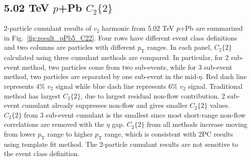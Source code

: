 \subsection{5.02 TeV $p$+Pb $C_{2}\{2\}$}
2-particle cumulant results of $v_{2}$ harmonic from 5.02 TeV $p$+Pb are summarized in Fig.~\ref{fig:result_pPb5_C22}. Four rows have different event class definitions and two columns are particles with different $p_{\text{T}}$ ranges. In each panel, $C_{2}\{2\}$ calculated using three cumulant methods are compared. In particular, for 2 sub-event method, two particles come from two sub-events, while for 3 sub-event method, two particles are separated by one sub-event in the mid-$\eta$. Red dash line represents $4\%$ $v_{2}$ signal while blue dash line represents $6\%$ $v_{2}$ signal. Traditional method has largest $C_{2}\{2\}$, due to largest residual non-flow contribution. 2 sub-event cumulant already suppresses non-flow and gives smaller $C_{2}\{2\}$ values. $C_{2}\{2\}$ from 3 sub-event cumulant is the smallest since most short-range non-flow correlations are removed with the $\eta$ gap. $C_{2}\{2\}$ from all methods increase moving from lower $p_{\text{T}}$ range to higher $p_{\text{T}}$ range, which is consistent with 2PC results using template fit method. The 2-particle cumulant results are not sensitive to the event class definition.
